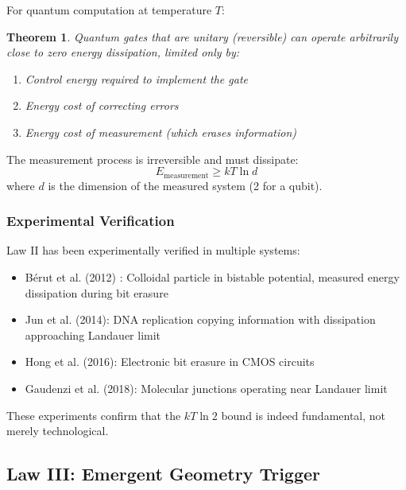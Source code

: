 \documentclass[11pt,a4paper]{article}
\theoremstyle{plain}
\newtheorem{theorem}{Theorem}[section]
\theoremstyle{definition}
\theoremstyle{remark}
\begin{document}
For quantum computation at temperature $T$:

\begin{theorem}
Quantum gates that are unitary (reversible) can operate arbitrarily close to zero energy dissipation, limited only by:
\begin{enumerate}
\item Control energy required to implement the gate
\item Energy cost of correcting errors
\item Energy cost of measurement (which erases information)
\end{enumerate}
\end{theorem}

The measurement process is irreversible and must dissipate:
\begin{equation}
E_{\text{measurement}} \geq kT\ln d
\end{equation}
where $d$ is the dimension of the measured system (2 for a qubit).

\subsubsection{Experimental Verification}

Law II has been experimentally verified in multiple systems:

\begin{itemize}[leftmargin=*]
\item Bérut et al. (2012) \cite{berut2012experimental}: Colloidal particle in bistable potential, measured energy dissipation during bit erasure
\item Jun et al. (2014): DNA replication copying information with dissipation approaching Landauer limit
\item Hong et al. (2016): Electronic bit erasure in CMOS circuits
\item Gaudenzi et al. (2018): Molecular junctions operating near Landauer limit
\end{itemize}

These experiments confirm that the $kT\ln 2$ bound is indeed fundamental, not merely technological.

\subsection{Law III: Emergent Geometry Trigger}
\end{document}
